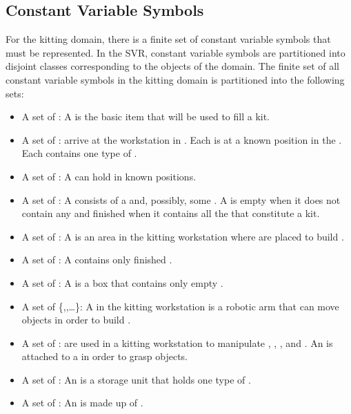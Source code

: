 \subsection{Constant Variable Symbols}
For the kitting domain, there is a finite set of constant variable symbols that must be represented. In the SVR, constant variable symbols are partitioned into disjoint classes corresponding to the objects of the domain. The finite set of all constant variable symbols in the kitting domain is partitioned into the following sets:
\begin{itemize}
\item A set of : A  is the basic item that will be used to fill a kit.

\item A set of :  arrive at the workstation in . Each  is at a known position in the . Each  contains one type of .

\item A set of :  A  can hold  in known positions.

\item A set of : A  consists of a  and, possibly, some . A  is empty when it does not contain any  and finished when it contains all the  that constitute a kit.

\item A set of : A  is an area in the kitting workstation where  are placed to build .

\item A set of : A  contains only finished .

\item A set of : A  is a box that contains only empty .

\item A set of  \{,,\ldots\}: A  in the kitting workstation is a robotic arm that can move objects in order to build .

\item A set of :  are used in a kitting workstation to manipulate , , , and . An  is attached to a  in order to grasp objects.

\item A set of : An  is a storage unit that holds one type of .

\item A set of : An  is made up of .
\end{itemize}

